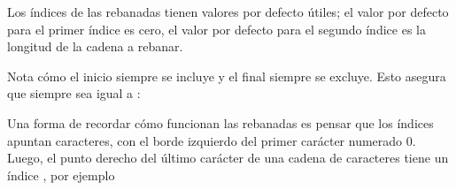 \documentclass[a5paper,10pt,spanish]{sphinxmanual}
\begin{document}
\sphinxAtStartPar
Los índices de las rebanadas tienen valores por defecto útiles; el valor por defecto para el primer índice es cero, el valor por defecto para el segundo índice es la longitud de la cadena a rebanar.

\begin{sphinxVerbatim}[commandchars=\\\{\}]
\PYG{p}{[}\PYG{p}{]}   
\PYG{p}{[}\PYG{p}{]}   
\PYG{p}{[}\PYG{p}{]}  
\end{sphinxVerbatim}

\sphinxAtStartPar
Nota cómo el inicio siempre se incluye y el final siempre se excluye. Esto asegura que  siempre sea igual a :

\begin{sphinxVerbatim}[commandchars=\\\{\}]
\PYG{p}{[}\PYG{p}{]}  \PYG{p}{[}\PYG{p}{]}
\PYG{p}{[}\PYG{p}{]}  \PYG{p}{[}\PYG{p}{]}
\end{sphinxVerbatim}

\sphinxAtStartPar
Una forma de recordar cómo funcionan las rebanadas es pensar que los índices apuntan  caracteres, con el borde izquierdo del primer carácter numerado 0. Luego, el punto derecho del último carácter de una cadena de  caracteres tiene un índice , por ejemplo
\end{document}
